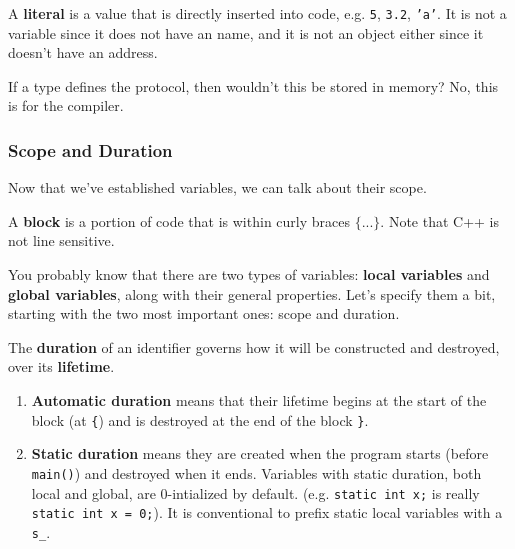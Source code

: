 \documentclass{article}
\newcounter{theorem}[section]
\newcounter{definition}[section]
\newcounter{code}[section]
\begin{document}
      \begin{definition}[Literal]
        \label{def:literal}
        A \textbf{literal} is a value that is directly inserted into code, e.g. \texttt{5}, \texttt{3.2}, \texttt{'a'}. It is not a variable since it does not have an name, and it is not an object either since it doesn't have an address. 
      \end{definition} 

      \begin{theorem}
        \label{thm:types-are-not-objects}
        If a type defines the protocol, then wouldn't this be stored in memory? No, this is for the compiler.  
      \end{theorem}

    \subsubsection{Scope and Duration} 

      Now that we've established variables, we can talk about their scope. 
      
      \begin{definition}[Block]
        \label{def:block}
        A \textbf{block} is a portion of code that is within curly braces $\texttt{\{ ...\}}$. Note that C++ is not line sensitive.
      \end{definition}

      You probably know that there are two types of variables: \textbf{local variables} and \textbf{global variables}, along with their general properties. Let's specify them a bit, starting with the two most important ones: scope and duration.  

      \begin{definition}[Duration]
        \label{def:duration}
        The \textbf{duration} of an identifier governs how it will be constructed and destroyed, over its \textbf{lifetime}. 
        \begin{enumerate}
          \item \textbf{Automatic duration} means that their lifetime begins at the start of the block (at \texttt{\{}) and is destroyed at the end of the block \texttt{\}}. 
          \item \textbf{Static duration} means they are created when the program starts (before \texttt{main()}) and destroyed when it ends. Variables with static duration, both local and global, are 0-intialized by default. (e.g. \texttt{static int x;} is really \texttt{static int x = 0;}). It is conventional to prefix static local variables with a \texttt{s\_}. 
        \end{enumerate}
      \end{definition} 
\end{document}
